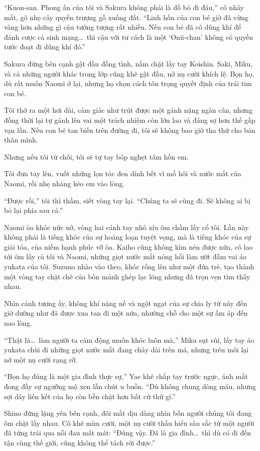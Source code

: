 \documentclass[../main.tex]{subfiles}
\begin{document}
``Kuon-san. Phong ấn của tôi và Sakura không phải là đồ bỏ đi đâu,'' cô nháy mắt, gõ nhẹ cây quyền trượng gỗ xuống đất. ``Linh hồn của con bé giờ đã vững vàng hơn những gì cậu tưởng tượng rất nhiều. Nếu con bé đã có dũng khí để đánh cược cả sinh mạng\dots\ thì cậu với tư cách là một `Onii-chan' không có quyền tước đoạt đi dũng khí đó.''

Sakura đứng bên cạnh gật đầu đồng tình, nắm chặt lấy tay Koishin. Saki, Miku, và cả những người khác trong lớp cũng khẽ gật đầu, nở nụ cười khích lệ. Bọn họ, dù rất muốn Naomi ở lại, nhưng họ chọn cách tôn trọng quyết định của trái tim con bé.

Tôi thở ra một hơi dài, cảm giác như trút được một gánh nặng ngàn cân, nhưng đồng thời lại tự gánh lên vai một trách nhiệm còn lớn lao và đáng sợ hơn thế gấp vạn lần. Nếu con bé tan biến trên đường đi, tôi sẽ không bao giờ tha thứ cho bản thân mình.

Nhưng nếu tôi từ chối, tôi sẽ tự tay bóp nghẹt tâm hồn em.

Tôi đưa tay lên, vuốt những lọn tóc đen dính bết vì mồ hôi và nước mắt của Naomi, rồi nhẹ nhàng kéo em vào lòng.

``Được rồi,'' tôi thì thầm, siết vòng tay lại. ``Chúng ta sẽ cùng đi. Sẽ không ai bị bỏ lại phía sau cả.''

Naomi òa khóc nức nở, vòng hai cánh tay nhỏ xíu ôm chầm lấy cổ tôi. Lần này không phải là tiếng khóc của sự hoảng loạn tuyệt vọng, mà là tiếng khóc của sự giải tỏa, của niềm hạnh phúc vỡ òa. Kaiho cũng không kìm nén được nữa, cô lao tới ôm lấy cả tôi và Naomi, những giọt nước mắt nóng hổi làm ướt đẫm vai áo yukata của tôi. Suzuno nhào vào theo, khóc rống lên như một đứa trẻ, tạo thành một vòng tay chặt chẽ của bốn mảnh ghép lạc lõng nhưng đã trọn vẹn tìm thấy nhau.

Nhìn cảnh tượng ấy, không khí nặng nề và ngột ngạt của sự chia ly từ nãy đến giờ dường như đã được xua tan đi một nửa, nhường chỗ cho một sự ấm áp đến nao lòng.

``Thật là\dots\ làm người ta cảm động muốn khóc luôn mà,'' Miku sụt sùi, lấy tay áo yukata chùi đi những giọt nước mắt đang chảy dài trên má, nhưng trên môi lại nở một nụ cười rạng rỡ.

``Bọn họ đúng là một gia đình thực sự,'' Yae khẽ chắp tay trước ngực, ánh mắt đong đầy sự ngưỡng mộ xen lẫn chút u buồn. ``Dù không chung dòng máu, nhưng sợi dây liên kết của họ còn bền chặt hơn bất cứ thứ gì.''

Shino đứng lặng yên bên cạnh, đôi mắt dịu dàng nhìn bốn người chúng tôi đang ôm chặt lấy nhau. Cô khẽ mỉm cười, một nụ cười thấu hiểu sâu sắc từ một người đã từng trải qua nỗi đau mất mát: ``Đúng vậy. Đã là gia đình\dots\ thì dù có đi đến tận cùng thế giới, cũng không thể tách rời được.''
\end{document}
